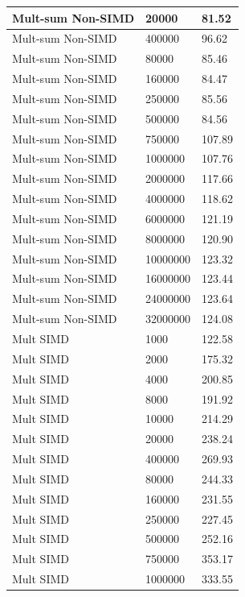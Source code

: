 \documentclass{article}
\begin{document}
\begin{longtable}{|l|l|l|}
Mult-sum Non-SIMD & 20000     & 81.52     \\ \hline
Mult-sum Non-SIMD & 400000    & 96.62     \\ \hline
Mult-sum Non-SIMD & 80000     & 85.46     \\ \hline
Mult-sum Non-SIMD & 160000    & 84.47     \\ \hline
Mult-sum Non-SIMD & 250000    & 85.56     \\ \hline
Mult-sum Non-SIMD & 500000    & 84.56     \\ \hline
Mult-sum Non-SIMD & 750000    & 107.89    \\ \hline
Mult-sum Non-SIMD & 1000000   & 107.76    \\ \hline
Mult-sum Non-SIMD & 2000000   & 117.66    \\ \hline
Mult-sum Non-SIMD & 4000000   & 118.62    \\ \hline
Mult-sum Non-SIMD & 6000000   & 121.19    \\ \hline
Mult-sum Non-SIMD & 8000000   & 120.90    \\ \hline
Mult-sum Non-SIMD & 10000000  & 123.32    \\ \hline
Mult-sum Non-SIMD & 16000000  & 123.44    \\ \hline
Mult-sum Non-SIMD & 24000000  & 123.64    \\ \hline
Mult-sum Non-SIMD & 32000000  & 124.08    \\ \hline
Mult SIMD         & 1000      & 122.58    \\ \hline
Mult SIMD         & 2000      & 175.32    \\ \hline
Mult SIMD         & 4000      & 200.85    \\ \hline
Mult SIMD         & 8000      & 191.92    \\ \hline
Mult SIMD         & 10000     & 214.29    \\ \hline
Mult SIMD         & 20000     & 238.24    \\ \hline
Mult SIMD         & 400000    & 269.93    \\ \hline
Mult SIMD         & 80000     & 244.33    \\ \hline
Mult SIMD         & 160000    & 231.55    \\ \hline
Mult SIMD         & 250000    & 227.45    \\ \hline
Mult SIMD         & 500000    & 252.16    \\ \hline
Mult SIMD         & 750000    & 353.17    \\ \hline
Mult SIMD         & 1000000   & 333.55    \\ \hline

\end{longtable}
\end{document}
